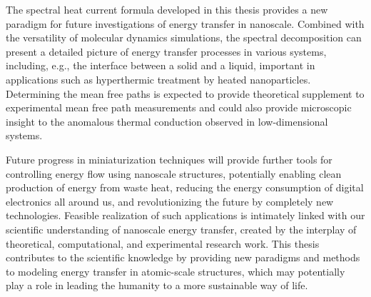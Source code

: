 The spectral heat current formula developed in this thesis provides a new paradigm for future investigations of energy transfer in nanoscale. Combined with the versatility of molecular dynamics simulations, the spectral decomposition can present a detailed picture of energy transfer processes in various systems, including, e.g., the interface between a solid and a liquid, important in applications such as hyperthermic treatment by heated nanoparticles. Determining the mean free paths is expected to provide theoretical supplement to experimental mean free path measurements and could also provide microscopic insight to the anomalous thermal conduction observed in low-dimensional systems.

Future progress in miniaturization techniques will provide further tools for controlling energy flow using nanoscale structures, potentially enabling clean production of energy from waste heat, reducing the energy consumption of digital electronics all around us, and revolutionizing the future by completely new technologies. Feasible realization of such applications is intimately linked with our scientific understanding of nanoscale energy transfer, created by the interplay of theoretical, computational, and experimental research work. This thesis contributes to the scientific knowledge by providing new paradigms and methods to modeling energy transfer in atomic-scale structures, which may potentially play a role in leading the humanity to a more sustainable way of life. 







